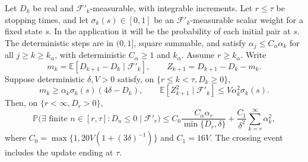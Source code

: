 \begin{lemma}\label{lem:barrier}
Let $D_k$ be real and $\mathcal F'_k$-measurable, with integrable increments. Let $r\le\tau$ be stopping times, and let $\sigma_k(s)\in[0,1]$ be an $\mathcal F'_k$-measurable scalar weight for a fixed state $s$. In the application it will be the probability of each initial pair at $s$. The deterministic steps are in $(0,1]$, square summable, and satisfy $\alpha_j\le C_\alpha\alpha_k$ for all $j\ge k\ge k_\alpha$, with deterministic $C_\alpha\ge1$ and $k_\alpha$. Assume $r\ge k_\alpha$. Write
\[
m_k=\mathbb E[D_{k+1}-D_k\mid\mathcal F'_k],\qquad
Z_{k+1}=D_{k+1}-D_k-m_k.
\]
Suppose deterministic $\delta,V>0$ satisfy, on $\{r\le k<\tau,D_k\ge0\}$,
\begin{equation}\label{eq:barrierhyp}
m_k\ge\alpha_k\sigma_k(s)(4\delta-D_k),\qquad
\mathbb E[Z_{k+1}^2\mid\mathcal F'_k]\le V\alpha_k^2\sigma_k(s).
\end{equation}
Then, on $\{r<\infty,D_r>0\}$,
\begin{equation}\label{eq:barrier}
\mathbb P\bigl(\exists\text{ finite }n\in[r,\tau]:D_n\le0\mid\mathcal F'_r\bigr)
\le C_0\frac{C_\alpha\alpha_r}{\min\{D_r,\delta\}}+\frac{C_1}{\delta^2}\sum_{k=r}^{\infty}\alpha_k^2,
\end{equation}
where $C_0=\max\{1,20V(1+(3\delta)^{-1})\}$ and $C_1=16V$. The crossing event includes the update
ending at $\tau$.
\end{lemma}
